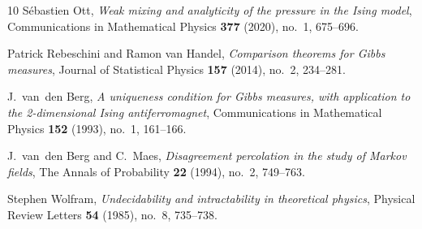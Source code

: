 \documentclass[11pt,reqno]{amsart}
\numberwithin{equation}{section}
\theoremstyle{definition}
\theoremstyle{remark}
\begin{document}
\begin{thebibliography}{10}
S{\'e}bastien Ott, \emph{Weak mixing and analyticity of the pressure in the
  {Ising} model}, Communications in Mathematical Physics \textbf{377} (2020),
  no.~1, 675--696.

Patrick Rebeschini and Ramon van Handel, \emph{Comparison theorems for {Gibbs}
  measures}, Journal of Statistical Physics \textbf{157} (2014), no.~2,
  234--281.

J.~van~den Berg, \emph{A uniqueness condition for {Gibbs} measures, with
  application to the 2-dimensional {Ising} antiferromagnet}, Communications in
  Mathematical Physics \textbf{152} (1993), no.~1, 161--166.

J.~van~den Berg and C.~Maes, \emph{Disagreement percolation in the study of
  {Markov} fields}, The Annals of Probability \textbf{22} (1994), no.~2,
  749--763.

Stephen Wolfram, \emph{Undecidability and intractability in theoretical
  physics}, Physical Review Letters \textbf{54} (1985), no.~8, 735--738.

\end{thebibliography}
\end{document}
